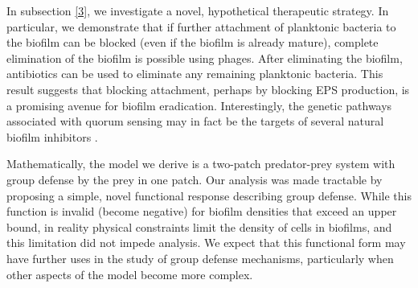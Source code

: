 In subsection \ref{3}, we investigate a novel, hypothetical therapeutic strategy.  In particular, we demonstrate that if further attachment of planktonic bacteria to the biofilm can be blocked (even if the biofilm is already mature), complete elimination of the biofilm is possible using phages.  After eliminating the biofilm, antibiotics can be used to eliminate any remaining planktonic bacteria.  This result suggests that blocking attachment, perhaps by blocking EPS production, is a promising avenue for biofilm eradication.  Interestingly, the genetic pathways associated with quorum sensing may in fact be the targets of several natural biofilm inhibitors \citep{lee_low_2011}.%

Mathematically, the model we derive is a two-patch predator-prey system with group defense by the prey in one patch.  Our analysis was made tractable by proposing a simple, novel functional response describing group defense.  While this function is invalid (become negative) for biofilm densities that exceed an upper bound, in reality physical constraints limit the density of cells in biofilms, and this limitation did not impede analysis.  We expect that this functional form may have further uses in the study of group defense mechanisms, particularly when other aspects of the model become more complex.





